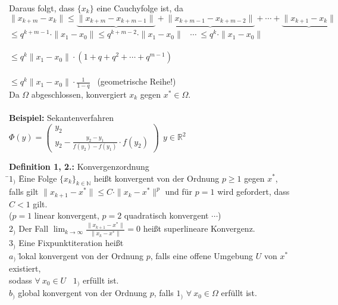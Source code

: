 \documentclass[10pt,a4paper]{article}
\begin{document}
Daraus folgt, dass $\{x_k\}$ eine Cauchyfolge ist, da
\\$\|x_{k+m}-x_k\|\leq \underbrace{\|x_{k+m}-x_{k+m-1}\|}+\underbrace{\|x_{k+m-1}-x_{k+m-2}\|}+\cdots +\underbrace{\|x_{k+1}-x_k\|}$
\\\hspace*{21mm}$\leq q^{k+m-1}\cdot \|x_1-x_0\|$\hspace*{3mm}$\leq q^{k+m-2}\cdot \|x_1-x_0\|$ \ $\cdots \ \leq q^k\cdot \|x_1-x_0\|$\\
\\\hspace*{21mm}$\leq q^k\|x_1-x_0\| \cdot (1+q+q^2+\cdots +q^{m-1})$\\
\\\hspace*{21mm}$\leq q^k\|x_1-x_0\| \cdot \frac{1}{1-q}$ \ (geometrische Reihe!)
\newline
\\Da $\Omega$ abgeschlossen, konvergiert $x_k$ gegen $x^* \in \Omega$.\\
\\\textbf{Beispiel:} Sekantenverfahren
\\\hspace*{8mm}$\Phi(y)=\begin{pmatrix} y_2 \\ y_2-\frac{y_2-y_1}{f(y_2)-f(y_1)}\cdot f(y_2)\end{pmatrix} \ \ y\in \mathbb{R}^2$\\
\newline
\begin{tabbing}
\textbf{Definition 1, 2.:} Konvergenzordnung
\\\hspace*{8mm} \=$1_)$ \= Eine Folge $\{x_k \}_{k\in\mathbb{N}}$ heißt konvergent von der Ordnung $p\geq 1$ gegen $x^*$,\\
\>\>falls gilt $\| x_{k+1}-x^*\|\leq C\cdot \|x_k-x^*\|^p$ und für $p=1$ wird gefordert, dass $C<1$ gilt.\\
\>\>($p=1$ linear konvergent, $p=2$ quadratisch konvergent $\cdots$)\\
\> $2_)$ Der Fall $\lim_{k \to \infty}\frac{\|x_{k+1}-x^*\|}{\|x_k -x^*\|}=0$ heißt superlineare Konvergenz.\\
\> $3_)$ Eine Fixpunktiteration heißt\\
\>\>$a_)$ \= lokal konvergent von der Ordnung $p$, falls eine offene Umgebung $U$ von $x^*$ existiert,\\
\>\>\> sodass $\forall \ x_0\in U$ \ $1_)$ erfüllt ist.\\
\>\> $b_)$ global konvergent von der Ordnung $p$, falls $1_)$ $\forall \ x_0\in \Omega$ erfüllt ist.
\end{tabbing}
\end{document}
